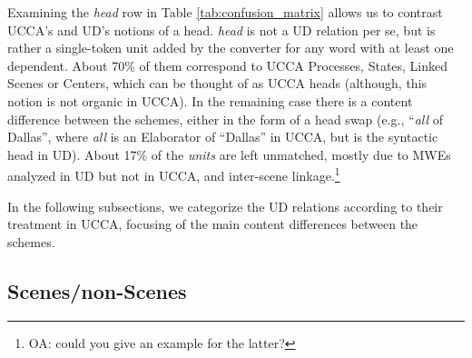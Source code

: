 \documentclass[11pt,a4paper]{article}
\newcommand{\oa}[1]{\footnote{\color{red}OA: #1}}
\begin{document}
Examining the {\it head} row in Table \ref{tab:confusion_matrix} allows
us to contrast UCCA's and UD's notions of a head. 
{\it head} is not a UD relation per se, but is rather a single-token unit
added by the converter for any word with at least one dependent.
About 70\% of them correspond to UCCA Processes, States, Linked Scenes or Centers,
which can be thought of as UCCA heads (although, this notion is not organic in UCCA).
In the remaining case there is a content difference between the schemes,
either in the form of a head swap (e.g., ``\textit{all} of Dallas'', where \textit{all} 
is an Elaborator of ``Dallas'' in UCCA, but is the syntactic head in UD).
About 17\% of the {\it units} are left unmatched, mostly due to MWEs analyzed in 
UD but not in UCCA, and inter-scene linkage.\oa{could you give an example for the latter?} 

In the following subsections, we categorize the UD relations according to their
treatment in UCCA, focusing of the main content differences between the schemes.

\subsection{Scenes/non-Scenes}\label{sec:scenes}
\end{document}
